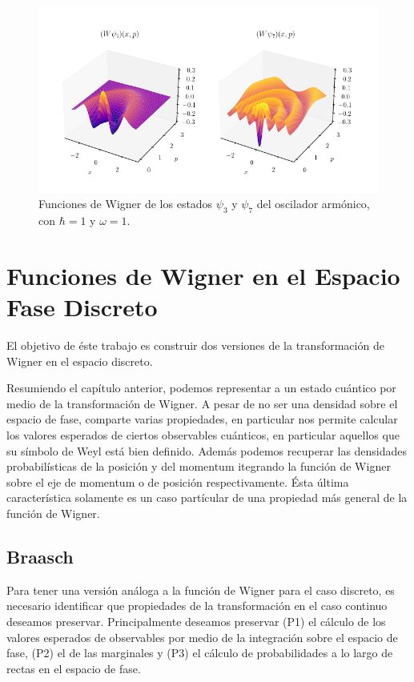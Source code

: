 \documentclass[a4paper]{report}
\begin{document}
  \begin{figure}[ht]
    \centering
    \includegraphics[width=1\textwidth]{
      imgs/harmonic_osc_wigner.png
    }
    \caption{Funciones de Wigner de los estados $\psi_3$ y
    $\psi_7$ del oscilador armónico, con $\hbar = 1$ y
    $\omega = 1$.}
    \label{fig:harmonic_osc_wigner_3_7}
  \end{figure}

  \chapter{Funciones de Wigner en el Espacio Fase Discreto}

  El objetivo de éste trabajo es construir dos versiones de
  la transformación de Wigner en el espacio discreto.

  Resumiendo el capítulo anterior, podemos representar a un
  estado cuántico por medio de la transformación de Wigner.
  A pesar de no ser una densidad sobre el espacio de fase,
  comparte varias propiedades, en particular nos permite
  calcular los valores esperados de ciertos observables
  cuánticos, en particular aquellos que su símbolo de Weyl
  está bien definido. Además podemos recuperar las
  densidades probabilísticas de la posición y del momentum
  itegrando la función de Wigner sobre el eje de momentum o
  de posición respectivamente. Ésta última característica
  solamente es un caso partícular de una propiedad más
  general de la función de Wigner.

  \section{Braasch}

  Para tener una versión análoga a la función de Wigner para
  el caso discreto, es necesario identificar que propiedades
  de la transformación en el caso continuo deseamos
  preservar.  Principalmente deseamos preservar (P1) el
  cálculo de los valores esperados de observables por medio
  de la integración sobre el espacio de fase, (P2) el de las
  marginales y (P3) el cálculo de probabilidades a lo largo
  de rectas en el espacio de fase.
\end{document}

